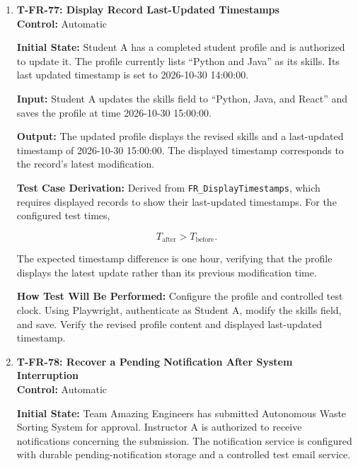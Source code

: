 \documentclass[12pt, titlepage]{article}
\begin{document}
\begin{enumerate}
\textbf{How Test Will Be Performed:} Configure the controlled provider to return a service-unavailable error. Trigger an authentication request and verify the resulting error record. Authenticate as Administrator A and inspect the external-provider error log. Verify that the event is recorded and that a notification is generated for an authorized recipient.

\item \label{T-FR-77}\textbf{T-FR-77: Display Record Last-Updated Timestamps}\\

\textbf{Control:} Automatic

\textbf{Initial State:} Student A has a completed student profile and is authorized to update it. The profile currently lists ``Python and Java'' as its skills. Its last updated timestamp is set to 2026-10-30 14:00:00.

\textbf{Input:} Student A updates the skills field to ``Python, Java, and React'' and saves the profile at time 2026-10-30 15:00:00.

\textbf{Output:} The updated profile displays the revised skills and a last-updated timestamp of 2026-10-30 15:00:00. The displayed timestamp corresponds to the record's latest modification.

\textbf{Test Case Derivation:} Derived from \texttt{FR\_DisplayTimestamps}, which requires displayed records to show their last-updated timestamps. For the configured test times,

\[
T_{\mathrm{after}}
>
T_{\mathrm{before}}.
\]

The expected timestamp difference is one hour, verifying that the profile displays the latest update rather than its previous modification time.

\textbf{How Test Will Be Performed:} Configure the profile and controlled test clock. Using Playwright, authenticate as Student A, modify the skills field, and save. Verify the revised profile content and displayed last-updated timestamp.

\item \label{T-FR-78}\textbf{T-FR-78: Recover a Pending Notification After System Interruption}\\

\textbf{Control:} Automatic

\textbf{Initial State:} Team Amazing Engineers has submitted Autonomous Waste Sorting System for approval. Instructor A is authorized to receive notifications concerning the submission. The notification service is configured with durable pending-notification storage and a controlled test email service.


\end{enumerate}
\end{document}
